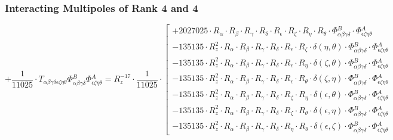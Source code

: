 \documentclass{article}
\begin{document}
\subsubsection*{Interacting Multipoles of Rank 4 and 4}
\begin{equation}
+ \frac{1}{11025} \cdot T_{\alpha{}\beta{}\gamma{}\delta{}\epsilon{}\zeta{}\eta{}\theta{}} \Phi{}^{B}_{\alpha{}\beta{}\gamma{}\delta{}} \Phi{}^{A}_{\epsilon{}\zeta{}\eta{}\theta{}} = R_{z}^{-17} \cdot \frac{1}{11025} \cdot  \left[ \begin{array}{c} 
 		+ 2027025 \cdot R_{\alpha{}} \cdot R_{\beta{}} \cdot R_{\gamma{}} \cdot R_{\delta{}} \cdot R_{\epsilon{}} \cdot R_{\zeta{}} \cdot R_{\eta{}} \cdot R_{\theta{}} \cdot \Phi{}^{B}_{\alpha{}\beta{}\gamma{}\delta{}} \cdot \Phi{}^{A}_{\epsilon{}\zeta{}\eta{}\theta{}} 
 \\[0.2em] 		 - 135135 \cdot R_{z}^{2} \cdot R_{\alpha{}} \cdot R_{\beta{}} \cdot R_{\gamma{}} \cdot R_{\delta{}} \cdot R_{\epsilon{}} \cdot R_{\zeta{}} \cdot \delta{}\left(\eta{}, \theta{}\right) \cdot \Phi{}^{B}_{\alpha{}\beta{}\gamma{}\delta{}} \cdot \Phi{}^{A}_{\epsilon{}\zeta{}\eta{}\theta{}} 
 \\[0.2em] 		 - 135135 \cdot R_{z}^{2} \cdot R_{\alpha{}} \cdot R_{\beta{}} \cdot R_{\gamma{}} \cdot R_{\delta{}} \cdot R_{\epsilon{}} \cdot R_{\eta{}} \cdot \delta{}\left(\zeta{}, \theta{}\right) \cdot \Phi{}^{B}_{\alpha{}\beta{}\gamma{}\delta{}} \cdot \Phi{}^{A}_{\epsilon{}\zeta{}\eta{}\theta{}} 
 \\[0.2em] 		 - 135135 \cdot R_{z}^{2} \cdot R_{\alpha{}} \cdot R_{\beta{}} \cdot R_{\gamma{}} \cdot R_{\delta{}} \cdot R_{\epsilon{}} \cdot R_{\theta{}} \cdot \delta{}\left(\zeta{}, \eta{}\right) \cdot \Phi{}^{B}_{\alpha{}\beta{}\gamma{}\delta{}} \cdot \Phi{}^{A}_{\epsilon{}\zeta{}\eta{}\theta{}} 
 \\[0.2em] 		 - 135135 \cdot R_{z}^{2} \cdot R_{\alpha{}} \cdot R_{\beta{}} \cdot R_{\gamma{}} \cdot R_{\delta{}} \cdot R_{\zeta{}} \cdot R_{\eta{}} \cdot \delta{}\left(\epsilon{}, \theta{}\right) \cdot \Phi{}^{B}_{\alpha{}\beta{}\gamma{}\delta{}} \cdot \Phi{}^{A}_{\epsilon{}\zeta{}\eta{}\theta{}} 
 \\[0.2em] 		 - 135135 \cdot R_{z}^{2} \cdot R_{\alpha{}} \cdot R_{\beta{}} \cdot R_{\gamma{}} \cdot R_{\delta{}} \cdot R_{\zeta{}} \cdot R_{\theta{}} \cdot \delta{}\left(\epsilon{}, \eta{}\right) \cdot \Phi{}^{B}_{\alpha{}\beta{}\gamma{}\delta{}} \cdot \Phi{}^{A}_{\epsilon{}\zeta{}\eta{}\theta{}} 
 \\[0.2em] 		 - 135135 \cdot R_{z}^{2} \cdot R_{\alpha{}} \cdot R_{\beta{}} \cdot R_{\gamma{}} \cdot R_{\delta{}} \cdot R_{\eta{}} \cdot R_{\theta{}} \cdot \delta{}\left(\epsilon{}, \zeta{}\right) \cdot \Phi{}^{B}_{\alpha{}\beta{}\gamma{}\delta{}} \cdot \Phi{}^{A}_{\epsilon{}\zeta{}\eta{}\theta{}} 

\end{array}
\end{equation}
\end{document}
